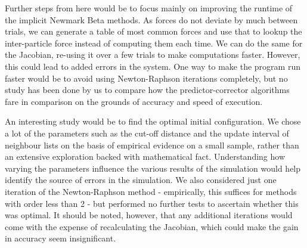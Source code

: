 \documentclass[../Main.tex]{subfiles}
\begin{document}
Further steps from here would be to focus mainly on improving the runtime of the implicit Newmark Beta methods. As forces do not deviate by much between trials, we can generate a table of most common forces and use that to lookup the inter-particle force instead of computing them each time. We can do the same for the Jacobian, re-using it over a few trials to make computations faster. However, this could lead to added errors in the system. One way to make the program run faster would be to avoid using Newton-Raphson iterations completely, but no study has been done by us to compare how the predictor-corrector algorithms fare in comparison on the grounds of accuracy and speed of execution.

An interesting study would be to find the optimal initial configuration. We chose a lot of the parameters such as the cut-off distance and the update interval of neighbour lists on the basis of empirical evidence on a small sample, rather than an extensive exploration backed with mathematical fact. Understanding how varying the parameters influence the various results of the simulation would help identify the source of errors in the simulation. We also considered just one iteration of the Newton-Raphson method - empirically, this suffices for methods with order less than 2 - but performed no further tests to ascertain whether this was optimal. It should be noted, however, that any additional iterations would come with the expense of recalculating the Jacobian, which could make the gain in accuracy seem insignificant.
\end{document}
